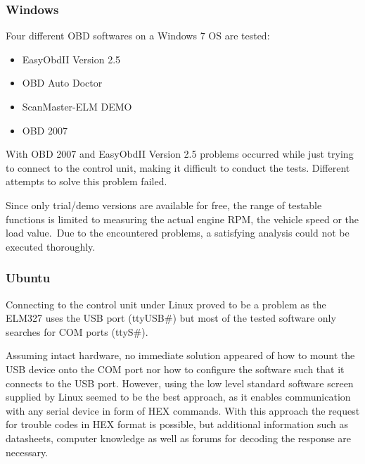 \hypertarget{h.6vg54mt7ey8d}{\subsubsection{\texorpdfstring{{Windows}}{Windows}}\label{h.6vg54mt7ey8d}}

{F}{our different OBD softwares on a Windows 7 OS are tested:}

\begin{itemize}
\tightlist
\item
  {EasyObdII Version 2.5}
\item
  {OBD Auto Doctor}
\item
  {ScanMaster-ELM DEMO}
\item
  {OBD 2007}
\end{itemize}

{}

{With OBD 2007 and EasyObdII Version 2.5 problems occurred while just
trying to connect to the control unit, making it difficult to conduct
the tests. Different attempts to solve this problem failed.}

{Since only trial/demo versions are available for free, the range of
testable functions is limited to measuring the actual engine RPM, the
vehicle speed or the load value.}{~}{Due to the encountered problems, a
satisfying analysis could not be executed thoroughly.}

\hypertarget{h.plxr4kgyruuo}{\subsubsection{\texorpdfstring{{Ubuntu}}{Ubuntu}}\label{h.plxr4kgyruuo}}

{Connecting to the control unit under Linux proved to be a problem as
the ELM327 uses the USB port (ttyUSB\#) but most of the tested software
only searches for COM ports (ttyS\#).}

{Assuming intact hardware, no immediate solution appeared of how to
mount the USB device onto the COM port nor how to configure the software
such that it connects to the USB port. }{However, }{using the low level
standard software }{s}{creen supplied by Linux seemed to be the best
approach, as it enables communication with any serial device in form of
HEX commands. With this approach the request for trouble codes in HEX
format is possible, but additional information such as datasheets,
computer knowledge as well as forums for decoding the response are
necessary.}

{}

